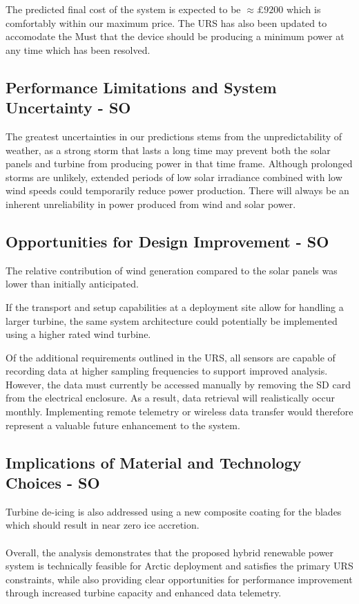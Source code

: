 \documentclass[11pt,a4paper]{article}
\begin{document}
The predicted final cost of the system is expected to be $\approx \pounds9200$ which is comfortably within our maximum price.
The URS has also been updated to accomodate the Must that the device should be producing a minimum power at any time which has been resolved. 

\subsection{Performance Limitations and System Uncertainty - SO}
The greatest uncertainties in our predictions stems from the unpredictability of weather, as a strong storm that lasts a long time may prevent both the solar panels and turbine from producing power in that time frame. Although prolonged storms are unlikely, extended periods of low solar irradiance combined with low wind speeds could temporarily reduce power production. There will always be an inherent unreliability in power produced from wind and solar power.

\subsection{Opportunities for Design Improvement - SO}
The relative contribution of wind generation compared to the solar panels was lower than initially anticipated.

If the transport and setup capabilities at a deployment site allow for handling a larger turbine, the same system architecture could potentially be implemented using a higher rated wind turbine.

Of the additional requirements outlined in the URS, all sensors are capable of recording data at higher sampling frequencies to support improved analysis. However, the data must currently be accessed manually by removing the SD card from the electrical enclosure. As a result, data retrieval will realistically occur monthly. Implementing remote telemetry or wireless data transfer would therefore represent a valuable future enhancement to the system.

\subsection{Implications of Material and Technology Choices - SO}
Turbine de-icing is also addressed using a new composite coating for the blades which should result in near zero ice accretion.
\\
\\
Overall, the analysis demonstrates that the proposed hybrid renewable power system is technically feasible for Arctic deployment and satisfies the primary URS constraints, while also providing clear opportunities for performance improvement through increased turbine capacity and enhanced data telemetry.
\end{document}
